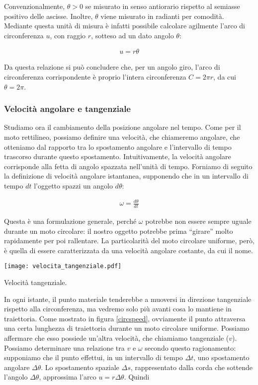 Convenzionalmente, $\theta > 0$ se misurato in senso antiorario
rispetto al semiasse positivo delle ascisse. Inoltre, $\theta$
viene misurato in radianti per comodità. Mediante questa unità di
misura è infatti possibile calcolare agilmente l'arco di circonferenza
$u$, con raggio $r$, sotteso ad un dato angolo $\theta$:

\begin{align}
    u = r\theta
\end{align}

\noindent Da questa relazione si può concludere che, per un angolo
giro, l'arco di circonferenza corrispondente è proprio l'intera
circonferenza $C = 2\pi r$, da cui $\theta = 2\pi$.

\subsubsection*{Velocità angolare e tangenziale}
Studiamo ora il cambiamento della posizione angolare nel tempo. Come
per il moto rettilineo, possiamo definire una velocità, che chiameremo
angolare, che otteniamo dal rapporto tra lo spostamento angolare e
l'intervallo di tempo trascorso durante questo spostamento. Intuitivamente,
la velocità angolare corrisponde alla fetta di angolo spazzata nell'unità
di tempo. Forniamo di seguito la definizione di velocità angolare istantanea,
supponendo che in un intervallo di tempo $dt$ l'oggetto spazzi un angolo
$d\theta$:

\begin{align}
    \omega = \frac{d\theta}{dt}
\end{align}

\noindent Questa è una formulazione generale, perché $\omega$ potrebbe
non essere sempre uguale durante un moto circolare: il nostro oggetto
potrebbe prima ``girare'' molto rapidamente per poi rallentare. La
particolarità del moto circolare uniforme, però, è quella di essere
caratterizzata da una velocità angolare costante, da cui il nome.

\begin{marginfigure}
    \centering
    \texttt{[image: velocita\_tangenziale.pdf]}
    \caption{Velocità tangenziale.}
    \label{circspeed}
\end{marginfigure}

In ogni istante, il punto materiale tenderebbe a muoversi in direzione
tangenziale rispetto alla circonferenza, ma vedremo solo più avanti
cosa lo mantiene in traiettoria. Come mostrato in figura \ref{circspeed},
ovviamente il punto attraversa
una certa lunghezza di traiettoria durante un moto circolare uniforme.
Possiamo affermare che esso possiede un'altra velocità, che chiamiamo
tangenziale ($v$). Possiamo determinare una relazione tra $v$ e $\omega$
secondo questo ragionamento: supponiamo che il punto effettui, in
un intervallo di tempo $\Delta t$, uno spostamento angolare $\Delta \theta$.
Lo spostamento spaziale $\Delta s$, rappresentato dalla corda che
sottende l'angolo $\Delta \theta$, approssima l'arco $u = r\Delta \theta$.
Quindi

